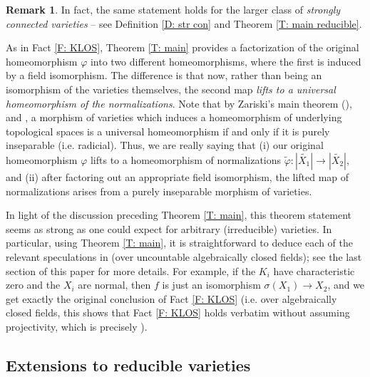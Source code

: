 \documentclass{amsart}
\theoremstyle{definition}
\newtheorem{remark}[theorem]{Remark}
\begin{document}
\begin{remark} In fact, the same statement holds for the larger class of \textit{strongly connected varieties} -- see Definition \ref{D: str con} and Theorem \ref{T: main reducible}.
\end{remark}

As in Fact \ref{F: KLOS}, Theorem \ref{T: main} provides a factorization of the original homeomorphism $\varphi$ into two different homeomorphisms, where the first is induced by a field isomorphism. The difference is that now, rather than being an isomorphism of the varieties themselves, the second map \textit{lifts to a universal homeomorphism of the normalizations}. Note that by Zariski's main theorem (\cite[\href{https://stacks.math.columbia.edu/tag/05K0}{Tag 05K0}]{stacks-project}), \cite[\href{https://stacks.math.columbia.edu/tag/01S2}{Tag 01S2}]{stacks-project} and \cite[\href{https://stacks.math.columbia.edu/tag/04DF}{Tag 04DF}]{stacks-project}, a morphism of varieties which induces a homeomorphism of underlying topological spaces is a universal homeomorphism if and only if it is purely inseparable (i.e. radicial). Thus, we are really saying that (i) our original homeomorphism $\varphi$ lifts to a homeomorphism of normalizations $\tilde\varphi:|\widetilde{X_1}|\rightarrow|\widetilde{X_2}|$, and (ii) after factoring out an appropriate field isomorphism, the lifted map of normalizations arises from a purely inseparable morphism of varieties. 

 In light of the discussion preceding Theorem \ref{T: main}, this theorem statement seems as strong as one could expect for arbitrary (irreducible) varieties. In particular, using Theorem \ref{T: main}, it is straightforward to deduce each of the relevant speculations in \cite{KLOS} (over uncountable algebraically closed fields); see the last section of this paper for more details. For example, if the $K_i$ have characteristic zero and the $X_i$ are normal, then $f$ is just an isomorphism $\sigma(X_1)\rightarrow X_2$, and we get exactly the original conclusion of Fact \ref{F: KLOS} (i.e. over algebraically closed fields, this shows that Fact \ref{F: KLOS} holds verbatim without assuming projectivity, which is precisely \cite[Speculation 2.2.14]{KLOS}).

 \subsection{Extensions to reducible varieties}
\end{document}
